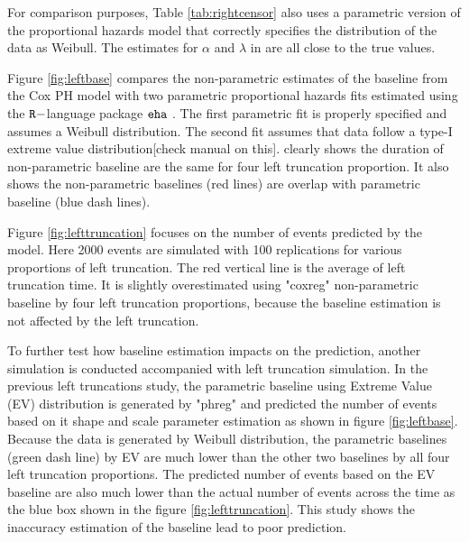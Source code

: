 \documentclass[12pt,letterpaper]{article}
\begin{document}
For comparison purposes, Table \ref{tab:rightcensor} also uses a parametric version of the proportional hazards model that correctly specifies the distribution of the data as Weibull. The estimates for $\alpha$ and $\lambda$ in  are all close to the true values.

Figure \ref{fig:leftbase} compares the non-parametric estimates of the baseline from the Cox PH model with two parametric proportional hazards fits estimated using the $\tt R-$language package $\tt eha$ \citep{Brostrom2014}.  The first parametric fit is properly specified and assumes a  Weibull distribution.  The second fit assumes that data follow a type-I extreme value distribution[check manual on this]. clearly shows the duration of non-parametric baseline are the same for four left truncation proportion. It also shows the non-parametric baselines (red lines) are overlap with parametric baseline (blue dash lines).

Figure \ref{fig:lefttruncation} focuses on the number of events predicted by the model.  Here 2000 events are simulated with 100 replications for various proportions of left truncation. The red vertical line is the average of left truncation time. It is slightly overestimated using "coxreg" non-parametric baseline by four left truncation proportions, because the baseline estimation is not affected by the left truncation.

To further test how baseline estimation impacts on the prediction, another simulation is conducted accompanied with left truncation simulation. In the previous left truncations study, the parametric baseline using Extreme Value (EV) distribution is generated by "phreg" and predicted the number of events based on it shape and scale parameter estimation as shown in figure \ref{fig:leftbase}. Because the data is generated by Weibull distribution, the parametric baselines (green dash line) by EV are much lower than the other two baselines by all four left truncation proportions. The predicted number of events based on the EV baseline are also much lower than the actual number of events across the time as the blue box shown in the figure \ref{fig:lefttruncation}. This study shows the inaccuracy estimation of the baseline lead to poor prediction.
\end{document}
